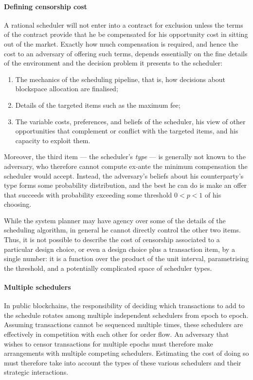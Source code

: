 \paragraph{Defining censorship cost}
%
A rational scheduler will not enter into a contract for exclusion unless the terms of the contract provide that he be compensated for his opportunity cost in sitting out of the market.
%
Exactly how much compensation is required, and hence the cost to an adversary of offering such terms, depends essentially on the fine details of the environment and the decision problem it presents to the scheduler:
%
\begin{enumerate}

  \item 
    The mechanics of the scheduling pipeline, that is, how decisions about blockspace allocation are finalised;
  \item 
    Details of the targeted items such as the maximum fee;
  \item
    The variable costs, preferences, and beliefs of the scheduler, his view of other opportunities that complement or conflict with the targeted items, and his capacity to exploit them.
\end{enumerate}
%
Moreover, the third item --- the scheduler's \emph{type} --- is generally not known to the adversary, who therefore cannot compute ex-ante the minimum compensation the scheduler would accept.
%
Instead, the adversary's beliefs about his counterparty's type forms some probability distribution, and the best he can do is make an offer that succeeds with probability exceeding some threshold $0<p<1$ of his choosing.

While the system planner may have agency over some of the details of the scheduling algorithm, in general he cannot directly control the other two items.
%
Thus, it is not possible to describe the cost of censorship associated to a particular design choice, or even a design choice plus a transaction item, by a single number: it is a function over the product of the unit interval, parametrising the threshold, and a potentially complicated space of scheduler types.




\paragraph{Multiple schedulers}
%
In public blockchains, the responsibility of deciding which transactions to add to the schedule rotates among multiple independent schedulers from epoch to epoch.
%
Assuming transactions cannot be sequenced multiple times, these schedulers are effectively in competition with each other for order flow.
%
An adversary that wishes to censor transactions for multiple epochs must therefore make arrangements with multiple competing schedulers.
%
Estimating the cost of doing so must therefore take into account the types of these various schedulers and their strategic interactions.

